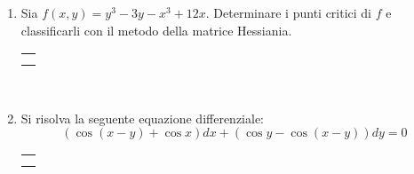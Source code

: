 \documentclass[12pt,a4paper]{report}\pagenumbering{roman}
\begin{document}
\begin{enumerate}
\item Sia $f(x,y)=y^3-3y-x^3+12x$. Determinare i punti critici di 
$f$ e classificarli con il metodo della matrice Hessiania.\\
\hspace*{-3.5cm}\begin{tabular}{c}\hline\\\hspace*{16cm}\end{tabular}\\
\hspace*{-3.5cm}{\bf SVOLGIMENTO:}\pagebreak

\item Si risolva la seguente equazione differenziale:
$$(\cos(x-y)+\cos x)dx+(\cos y-\cos(x-y))dy=0$$
\hspace*{-3.5cm}\begin{tabular}{c}\hline\\\hspace*{16cm}\end{tabular}\\
\hspace*{-3.5cm}{\bf SVOLGIMENTO:}

\end{enumerate}
\end{document}
